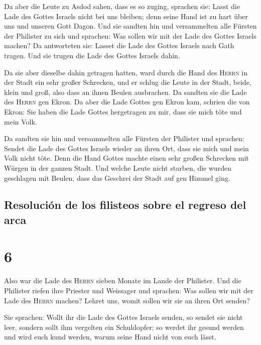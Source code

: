  Da aber die Leute zu Asdod sahen, dass es so zuging,
sprachen sie: Lasst die Lade des Gottes Israels nicht bei uns bleiben;
denn seine Hand ist zu hart über uns und unseren Gott Dagon.
 Und sie sandten hin und versammelten alle Fürsten der
Philister zu sich und sprachen: Was sollen wir mit der Lade des Gottes
Israels machen? Da antworteten sie: Lasset die Lade des Gottes Israels
nach Gath tragen. Und sie trugen die Lade des Gottes Israels dahin.

 Da sie aber dieselbe dahin getragen hatten, ward durch
die Hand des \textsc{Herrn} in der Stadt ein sehr großer Schrecken, und
er schlug die Leute in der Stadt, beide, klein und groß, also dass an
ihnen Beulen ausbrachen.  Da sandten sie die Lade des
\textsc{Herrn} gen Ekron. Da aber die Lade Gottes gen Ekron kam, schrien
die von Ekron: Sie haben die Lade Gottes hergetragen zu mir, dass sie
mich töte und mein Volk.

 Da sandten sie hin und versammelten alle Fürsten der
Philister und sprachen: Sendet die Lade des Gottes Israels wieder an
ihren Ort, dass sie mich und mein Volk nicht töte. Denn die Hand Gottes
machte einen sehr großen Schrecken mit Würgen in der ganzen Stadt.
 Und welche Leute nicht starben, die wurden geschlagen
mit Beulen, dass das Geschrei der Stadt auf gen Himmel ging.

\hypertarget{resoluciuxf3n-de-los-filisteos-sobre-el-regreso-del-arca}{%
\subsection{Resolución de los filisteos sobre el regreso del
arca}\label{resoluciuxf3n-de-los-filisteos-sobre-el-regreso-del-arca}}

\hypertarget{section-5}{%
\section{6}\label{section-5}}

 Also war die Lade des \textsc{Herrn} sieben Monate im
Lande der Philister.  Und die Philister riefen ihre
Priester und Weissager und sprachen: Was sollen wir mit der Lade des
\textsc{Herrn} machen? Lehret uns, womit sollen wir sie an ihren Ort
senden?

 Sie sprachen: Wollt ihr die Lade des Gottes Israels
senden, so sendet sie nicht leer, sondern sollt ihm vergelten ein
Schuldopfer; so werdet ihr gesund werden und wird euch kund werden,
warum seine Hand nicht von euch lässt.


